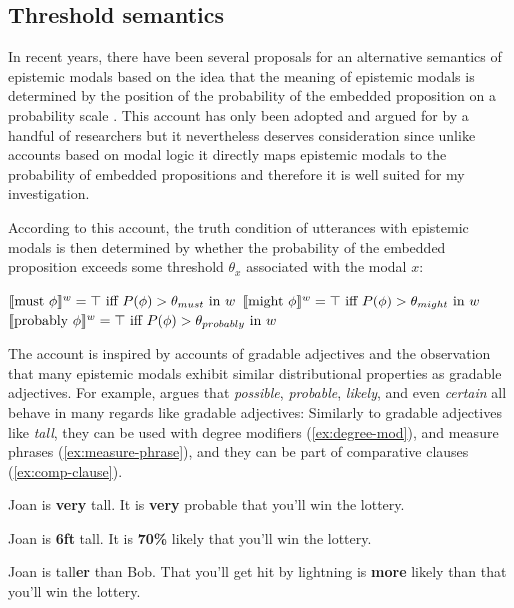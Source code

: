 \subsection{Threshold semantics}

In recent years, there have been several proposals for an alternative semantics of epistemic modals based on the idea that the meaning of 
epistemic modals is determined by the position of the probability of the embedded proposition on a probability scale
. This account has only been adopted and argued for by a handful of researchers
but it nevertheless deserves consideration since unlike accounts based on modal logic it directly maps epistemic modals to the probability of
embedded propositions and therefore it is well suited for my investigation.

According to this account, the truth condition of utterances with epistemic modals is then determined by whether
the probability of the embedded proposition exceeds some threshold $\theta_x$ associated with the modal $x$:

\begin{exe}
\ex $\llbracket\mbox{must }\phi\rrbracket^{w} = \top \mbox{ iff $P(\phi) > \theta_{must}$ in $w$} $
\ex $\llbracket\mbox{might } \phi\rrbracket^{w} = \top \mbox{ iff $P(\phi) > \theta_{might}$ in $w$} $
\ex $\llbracket\mbox{probably } \phi\rrbracket^{w} = \top \mbox{ iff $P(\phi) > \theta_{probably}$ in $w$} $
\end{exe}

The account is inspired by accounts of gradable adjectives  and the observation that many 
epistemic modals exhibit similar distributional properties as gradable adjectives. For example, \textcite{Lassiter2016} argues that \textit{possible}, \textit{probable},
\textit{likely}, and even \textit{certain} all behave in many regards like gradable adjectives: Similarly to gradable adjectives like \textit{tall}, 
they can be used with degree modifiers  (\ref{ex:degree-mod}), and measure phrases (\ref{ex:measure-phrase}), and they can be part of comparative clauses (\ref{ex:comp-clause}).

\begin{exe}
\ex \label{ex:degree-mod} \begin{xlist}
\ex Joan is \textbf{very} tall.
\ex It is \textbf{very} probable that you'll win the lottery.
\end{xlist}
\ex \label{ex:measure-phrase} \begin{xlist}
\ex Joan is \textbf{6ft} tall.
\ex It is \textbf{70\%} likely that you'll win the lottery.
\end{xlist}
\ex  \label{ex:comp-clause}  \begin{xlist}
\ex Joan is tall\textbf{er} than Bob.
\ex That you'll get hit by lightning is \textbf{more} likely than that you'll win the lottery.
\end{xlist}
\end{exe}


